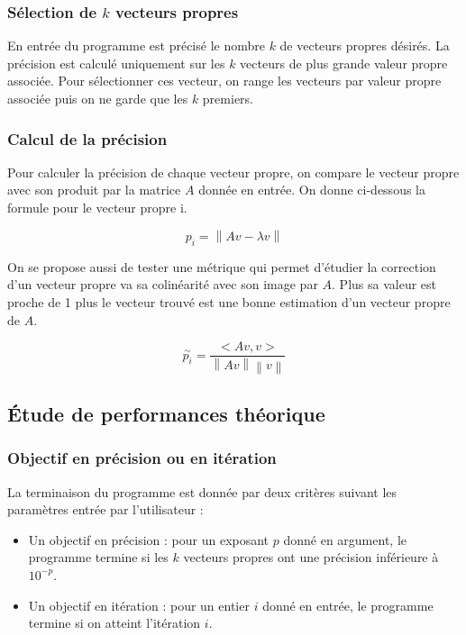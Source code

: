 \documentclass[11pt,a4paper]{article}
\newcommand{\norm}[1]{\left\lVert#1\right\rVert}
\begin{document}
		\subsubsection{Sélection de $k$ vecteurs propres}

			En entrée du programme est précisé le nombre $k$ de vecteurs propres désirés. La précision est calculé uniquement sur les $k$ vecteurs de plus grande valeur propre associée. Pour sélectionner ces vecteur, on range les vecteurs par valeur propre associée puis on ne garde que les $k$ premiers.

		\subsubsection{Calcul de la précision}

			Pour calculer la précision de chaque vecteur propre, on compare le vecteur propre avec son produit par la matrice $A$ donnée en entrée. On donne ci-dessous la formule pour le vecteur propre i.

			$$
			p_i = \norm{Av-\lambda v}
			$$

			On se propose aussi de tester une métrique qui permet d'étudier la correction d'un vecteur propre va sa colinéarité avec son image par $A$. Plus sa valeur est proche de 1 plus le vecteur trouvé est une bonne estimation d'un vecteur propre de $A$.

			$$
			\overset{\sim}{p_i} = \frac{<Av, v>}{\norm{Av}\norm{v}}
			$$

	\subsection{Étude de performances théorique}
		
		\subsubsection{Objectif en précision ou en itération}
			
			La terminaison du programme est donnée par deux critères suivant les paramètres entrée par l'utilisateur :
			\begin{itemize}
				\item Un objectif en précision : pour un exposant $p$ donné en argument, le programme termine si les $k$ vecteurs propres ont une précision inférieure à $10^{-p}$.
				\item Un objectif en itération : pour un entier $i$ donné en entrée, le programme termine si on atteint l'itération $i$.
			\end{itemize}
\end{document}
